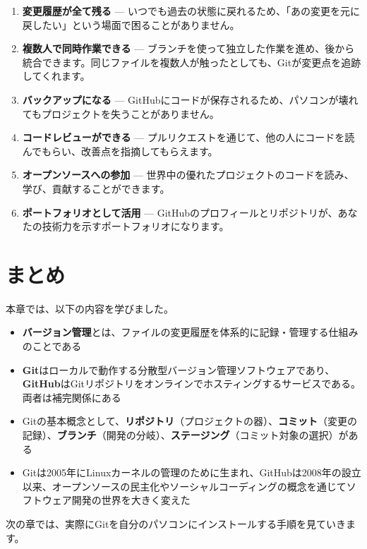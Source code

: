 \begin{enumerate}
  \item \textbf{変更履歴が全て残る} — いつでも過去の状態に戻れるため、「あの変更を元に戻したい」という場面で困ることがありません。
  \item \textbf{複数人で同時作業できる} — ブランチを使って独立した作業を進め、後から統合できます。同じファイルを複数人が触ったとしても、Gitが変更点を追跡してくれます。
  \item \textbf{バックアップになる} — GitHubにコードが保存されるため、パソコンが壊れてもプロジェクトを失うことがありません。
  \item \textbf{コードレビューができる} — プルリクエストを通じて、他の人にコードを読んでもらい、改善点を指摘してもらえます。
  \item \textbf{オープンソースへの参加} — 世界中の優れたプロジェクトのコードを読み、学び、貢献することができます。
  \item \textbf{ポートフォリオとして活用} — GitHubのプロフィールとリポジトリが、あなたの技術力を示すポートフォリオになります。
\end{enumerate}

\section{まとめ}

本章では、以下の内容を学びました。

\begin{itemize}
  \item \textbf{バージョン管理}とは、ファイルの変更履歴を体系的に記録・管理する仕組みのことである
  \item \textbf{Git}はローカルで動作する分散型バージョン管理ソフトウェアであり、\textbf{GitHub}はGitリポジトリをオンラインでホスティングするサービスである。両者は補完関係にある
  \item Gitの基本概念として、\textbf{リポジトリ}（プロジェクトの器）、\textbf{コミット}（変更の記録）、\textbf{ブランチ}（開発の分岐）、\textbf{ステージング}（コミット対象の選択）がある
  \item Gitは2005年にLinuxカーネルの管理のために生まれ、GitHubは2008年の設立以来、オープンソースの民主化やソーシャルコーディングの概念を通じてソフトウェア開発の世界を大きく変えた
\end{itemize}

次の章では、実際にGitを自分のパソコンにインストールする手順を見ていきます。
